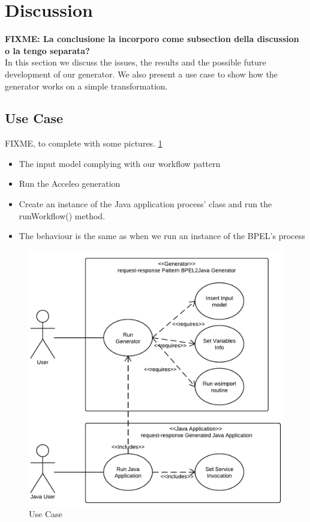 \section{Discussion}
\label{Discussion}
\textbf{FIXME: La conclusione la incorporo come subsection della discussion o la tengo separata? }\\
In this section we discuss the issues, the results and the possible future development of our generator. We also present a use case to show how the generator works on a simple transformation.



\subsection{Use Case}
\label{sec:UseCase}
FIXME, to complete with some pictures. \ref{fig:GeneratorUseCase}
\begin{itemize}
 \item The input model complying with our workflow pattern
 \item Run the Acceleo generation
 \item Create an instance of the Java application process' class and run the runWorkflow() method.
 \item The behaviour is the same as when we run an instance of the BPEL's process 
\end{itemize}

\begin{figure}
  \begin{center}
    \includegraphics[scale=1.5]{pictures/GeneratorUseCase.png}
    \caption{Use Case}
    \label{fig:GeneratorUseCase}
  \end{center}
\end{figure}



